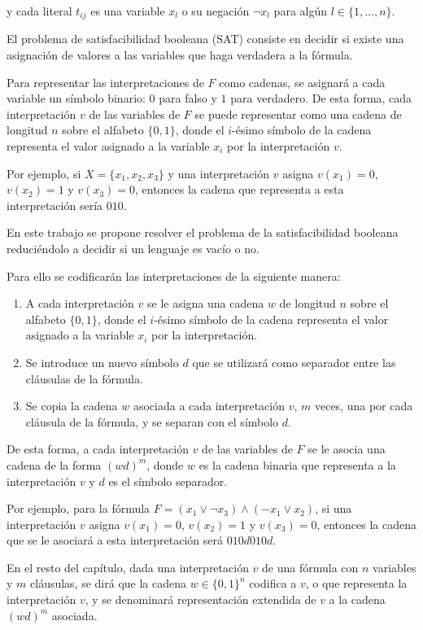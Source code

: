 y cada literal $t_{ij}$ es una variable $x_l$ o su negación $\neg x_l$ para algún $l \in \{1, \ldots, n\}$.

El problema de satisfacibilidad booleana (SAT) consiste en decidir si existe una asignación de valores a las variables que haga verdadera a la fórmula.

Para representar las interpretaciones de $F$ como cadenas, se asignará a cada variable un símbolo binario: $0$ para falso y $1$ para verdadero. De esta forma, cada interpretación $v$ de las variables de $F$ se puede representar como una cadena de longitud $n$ sobre el alfabeto $\{0, 1\}$, donde el $i$-ésimo símbolo de la cadena representa el valor asignado a la variable $x_i$ por la interpretación $v$.

Por ejemplo, si $X = \{x_1, x_2, x_3\}$ y una interpretación $v$ asigna $v(x_1) = 0$, $v(x_2) = 1$ y $v(x_3) = 0$, entonces la cadena que representa a esta interpretación sería $010$.

En este trabajo se propone resolver el problema de la satisfacibilidad booleana reduciéndolo a decidir si un lenguaje es vacío o no.

Para ello se codificarán las interpretaciones de la siguiente manera:
\begin{enumerate}
    \item A cada interpretación $v$ se le asigna una cadena $w$ de longitud $n$ sobre el alfabeto $\{0, 1\}$, donde el $i$-ésimo símbolo de la cadena representa el valor asignado a la variable $x_i$ por la interpretación.
    \item Se introduce un nuevo símbolo $d$ que se utilizará como separador entre las cláusulas de la fórmula.
    \item Se copia la cadena $w$ asociada a cada interpretación $v$, $m$ veces, una por cada cláusula de la fórmula, y se separan con el símbolo $d$.
\end{enumerate}

De esta forma, a cada interpretación $v$ de las variables de $F$ se le asocia una cadena de la forma $(wd)^m$, donde $w$ es la cadena binaria que representa a la interpretación $v$ y $d$ es el símbolo separador.

Por ejemplo, para la fórmula $F  = (x_1 \lor \neg x_3) \land (-x_1 \lor x_2)$, si una interpretación $v$ asigna $v(x_1) = 0$, $v(x_2) = 1$ y $v(x_3) = 0$, entonces la cadena que se le asociará a esta interpretación será $010d010d$.

En el resto del capítulo, dada una interpretación $v$ de una fórmula con $n$ variables y $m$ cláusulas, se dirá que la cadena $w \in \{0, 1\}^n$ codifica a $v$, o que representa la interpretación $v$, y se denominará representación extendida de $v$ a la cadena $(wd)^m$ asociada.

